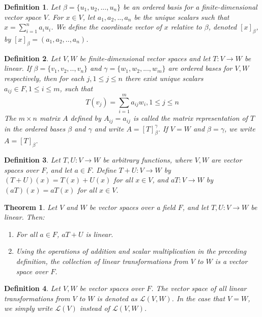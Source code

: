 \documentclass[a4paper]{article}
\newtheorem{mytheorem}{Theorem}
\newtheorem{mydef}{Definition}
\numberwithin{mytheorem}{section}
\numberwithin{mydef}{section}
\numberwithin{example}{section}
\begin{document}
\begin{mydef}  Let $\beta = \{u_{1},u_{2},...,u_{n} \} $ be an ordered basis for a finite-dimensional vector space $V$. For $x \in V$, let $a_{1},a_{2},..,a_{n}$ be the unique scalars such that $x = \sum^{n}_{i = 1} a_{i}u_{i}$. We define the coordinate vector of $x$ relative to $\beta$, denoted $[x]_{\beta}$, by $[x]_{\beta} = (a_{1},a_{2},..,a_{n})$. 
\end{mydef}

\begin{mydef}  Let $V,W$ be finite-dimensional vector spaces and let $T: V \rightarrow W$ be linear. If $\beta = \{ v_{1},v_{2},..,v_{n} \}$ and $\gamma = \{w_{1},w_{2},...,w_{m} \}$ are ordered bases for $V,W$ respectively, then for each $j, 1 \leq j \leq n$ there exist unique scalars $a_{ij} \in F, 1 \leq i \leq m$, such that $$T(v_{j}) = \sum^{m}_{i = 1} a_{ij}w_{i}, 1 \leq j \leq n$$ The $m \times n$ matrix $A$ defined by $A_{ij} = a_{ij}$ is called the matrix representation of $T$ in the ordered bases $\beta$ and $\gamma$ and write $A = [T]^{\gamma}_{\beta}$. If $V = W$ and $\beta = \gamma$, we write $A = [T]_{\beta}$.
\end{mydef}

\begin{mydef}  Let $T,U: V \rightarrow W$ be arbitrary functions, where $V,W$ are vector spaces over $F$, and let $a \in F$. Define $T + U: V \rightarrow W$ by $(T+U)(x) = T(x) + U(x)$ for all $x \in V$, and $aT: V \rightarrow W$ by $(aT)(x) = aT(x)$ for all $x \in V$.
\end{mydef}

\begin{mytheorem}Let $V$ and $W$ be vector spaces over a field $F$, and let $T,U: V \rightarrow W$ be linear. Then:
\begin{enumerate} 
\item For all $a \in F$, $aT + U$ is linear. 
\item Using the operations of addition and scalar multiplication in the preceding definition, the collection of linear transformations from $V$ to $W$ is a vector space over $F$.
\end{enumerate} 
\end{mytheorem}

\begin{mydef}  Let $V,W$ be vector spaces over $F$. The vector space of all linear transformations from $V$ to $W$ is denoted as $\mathcal{L}(V,W)$. In the case that $V = W$, we simply write $\mathcal{L}(V)$ instead of $\mathcal{L}(V,W)$.
\end{mydef}
\end{document}
